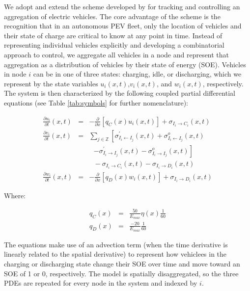 \documentclass[journal]{IEEEtran}
\begin{document}
We adopt and extend the scheme developed by \cite{lefloch_pde_2016} for tracking and controlling an aggregation of electric vehicles. The core advantage of the scheme is the recognition that in an autonomous PEV fleet, only the location of vehicles and their state of charge are critical to know at any point in time. Instead of representing individual vehicles explicitly and developing a combinatorial approach to control, we aggregate all vehicles in a node and represent that aggregation as a distribution of vehicles by their state of energy (SOE). Vehicles in node $i$ can be in one of three states: charging, idle, or discharging, which we represent by the state variables $u_i(x,t)$,$v_i(x,t)$, and $w_i(x,t)$, respectively. The system is then characterized by the following coupled partial differential equations (see Table \ref{tab:symbols} for further nomenclature): 

\begin{eqnarray*}
    \frac{\partial u_i}{\partial t}(x,t) &=& -\frac{\partial}{\partial x}\left[ q_C(x) u_i(x,t) \right] + \sigma_{I_i \rightarrow C_i}(x,t) \\
    \frac{\partial v_i}{\partial t}(x,t) &=& \sum_{j\in\mathbb{Z}} \left[ \sigma_{I_i \leftarrow I_j}^\prime(x,t) + \sigma_{I_i \leftarrow I_j}^o(x,t) \right. \\
    & & ~~~ \left. - \sigma_{I_i \rightarrow I_j}^\prime(x,t) - \sigma_{I_i \rightarrow I_j}^o(x,t) \right] \\
    && ~~~ - \sigma_{I_i \rightarrow C_i}(x,t) - \sigma_{I_i \rightarrow D_i}(x,t) \\
    \frac{\partial w_i}{\partial t}(x,t) &=& -\frac{\partial}{\partial x}\left[ q_D(x) w_i(x,t) \right] + \sigma_{I_i \rightarrow D_i}(x,t) 
\end{eqnarray*}

Where: 

\begin{eqnarray*}
q_C(x) &=& \frac{50}{E_{max}}\eta(x)\frac{1}{60} \\
q_D(x) &=& \frac{-20}{E_{max}}\frac{1}{60}
\end{eqnarray*}

The equations make use of an advection term (when the time derivative is linearly related to the spatial derivative) to represent how vehiclees in the charging or discharging state change their SOE over time and move toward an SOE of 1 or 0, respectively. The model is spatially disaggregated, so the three PDEs are repeated for every node in the system and indexed by $i$.
\end{document}
